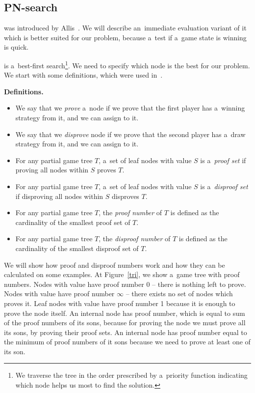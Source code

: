 \subsection{PN-search}

 was introduced by Allis~\cite{allis}. We will describe an~immediate evaluation
variant of it which is better suited for our problem, because a~test if a~game state is winning is
quick.

 is a~best-first search\footnote{We traverse the tree in the order prescribed by a~priority
function indicating which node helps us most to find the solution.}. We need to specify which node is the best for our problem.
We start with some definitions, which were used in~\cite{allis}. 

\medskip\noindent
\textbf{Definitions.}

\begin{itemize}
\item
We say that we \emph{prove} a~node if we prove that the first player has a~winning strategy
from it, and we can assign  to it. 

\item
We say that we \emph{disprove} node if we prove that the second player has a~draw strategy
from it, and we can assign  to it. 

\item
For any partial game tree $T$, a~set of leaf nodes with value  $S$ is a~{\sl proof set}
if proving all nodes within $S$ proves $T$.

\item
For any partial game tree $T$, a~set of leaf nodes with value  $S$ is a~{\sl disproof set}
if disproving all nodes within $S$ disproves $T$.

\item
For any partial game tree $T$, the {\sl proof number} of $T$ is defined as the 
cardinality of the smallest proof set of $T$.

\item
For any partial game tree $T$, the {\sl disproof number} of $T$ is defined as the 
cardinality of the smallest disproof set of $T$.
\end{itemize}

We will show how proof and disproof numbers work and how they can be calculated
on some examples. At Figure~\ref{tri}, we show a~game tree with proof
numbers. Nodes with value  have proof number 0 -- there is nothing
left to prove. Nodes with value  have proof number $ \infty $ --
there exists no set of nodes which proves it. Leaf nodes with value
 have proof number 1 because it is enough to prove the node
itself. An internal  node has proof number, which is equal to sum of the
proof numbers of its sons, because for proving the  node we must
prove all its sons, by proving their proof sets. An internal  node has
proof number equal to the minimum of proof numbers of it sons because we need to
prove at least one of its son.

